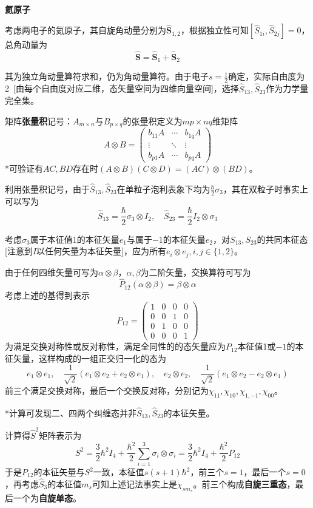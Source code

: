 \documentclass[a4paper,UTF8,fontset=windows]{ctexart}
\begin{document}
\

\textbf{氦原子}

考虑两电子的氦原子，其自旋角动量分别为$\hat{\mathbf{S}}_{1,2}$，根据独立性可知$[\hat{S}_{1i},\hat{S}_{2j}]=0$，总角动量为
$$\hat{\mathbf{S}}=\hat{\mathbf{S}}_1+\hat{\mathbf{S}}_2$$

其为独立角动量算符求和，仍为角动量算符。由于电子$s=\frac{1}{2}$确定，实际自由度为2\ [由每个自由度对应二维，态矢量空间为四维向量空间]，选择$\hat{S}_{13},\hat{S}_{23}$作为力学量完全集。

矩阵\textbf{张量积}记号：$A_{m\times n}$与$B_{p\times q}$的张量积定义为$mp\times nq$维矩阵
$$A\otimes B=\begin{pmatrix}b_{11}A&\cdots&b_{1q}A\\\vdots&\ddots&\vdots\\b_{p1}A&\cdots&b_{pq}A\end{pmatrix}$$
*可验证有$AC,BD$存在时$(A\otimes B)(C\otimes D)=(AC)\otimes(BD)$。

利用张量积记号，由于$\hat{S}_{13},\hat{S}_{23}$在单粒子泡利表象下均为$\frac{\hbar}{2}\sigma_3$，其在双粒子时事实上可以写为
$$\hat{S}_{13}=\frac{\hbar}{2}\sigma_3\otimes I_2,\quad\hat{S}_{23}=\frac{\hbar}{2}I_2\otimes\sigma_3$$

考虑$\sigma_3$属于本征值1的本征矢量$e_1$与属于$-1$的本征矢量$e_2$，对$S_{13},S_{23}$的共同本征态[注意到$I$以任何矢量为本征矢量]，应为所有$e_i\otimes e_j,i,j\in\{1,2\}$。

由于任何四维矢量可写为$\alpha\otimes\beta$，$\alpha,\beta$为二阶矢量，交换算符可写为
$$\hat{P}_{12}(\alpha\otimes\beta)=\beta\otimes\alpha$$
考虑上述的基得到表示
$$P_{12}=\begin{pmatrix}1&0&0&0\\0&0&1&0\\0&1&0&0\\0&0&0&1\end{pmatrix}$$
为满足交换对称性或反对称性，满足全同性的的态矢量应为$P_{12}$本征值1或$-1$的本征矢量，这样构成的一组正交归一化的态为
$$e_1\otimes e_1,\quad\frac{1}{\sqrt2}(e_1\otimes e_2+e_2\otimes e_1),\quad e_2\otimes e_2,\quad\frac{1}{\sqrt2}(e_1\otimes e_2-e_2\otimes e_1)$$
前三个满足交换对称，最后一个交换反对称，分别记为$\chi_{11},\chi_{10},\chi_{1,-1},\chi_{00}$。

*计算可发现二、四两个纠缠态并非$\hat{S}_{13},\hat{S}_{23}$的本征矢量。

计算得$\hat{S}^2$矩阵表示为
$$S^2=\frac{3}{2}\hbar^2I_4+\frac{\hbar^2}{2}\sum_{i=1}^3\sigma_i\otimes\sigma_i=\frac{3}{2}\hbar^2I_4+\frac{\hbar^2}{2}P_{12}$$
于是$P_{12}$的本征矢量与$S^2$一致，本征值$s(s+1)\hbar^2$，前三个$s=1$，最后一个$s=0$，再考虑$\hat{S}_3$的本征值$m_s$可知上述记法事实上是$\chi_{sm_s}$。前三个构成\textbf{自旋三重态}，最后一个为\textbf{自旋单态}。
\end{document}
